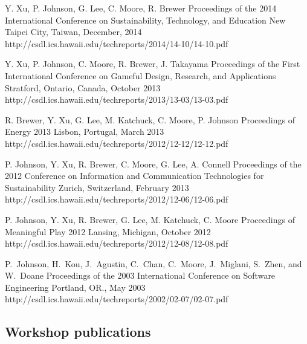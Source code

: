 \documentclass[11pt,letterpaper,sans]{moderncv} %
\begin{document}
    {Y. Xu, P. Johnson, G. Lee, C. Moore, R. Brewer}
    {Proceedings of the 2014 International Conference on Sustainability, Technology, and Education}
    {New Taipei City, Taiwan, December, 2014}
    {http://csdl.ics.hawaii.edu/techreports/2014/14-10/14-10.pdf}

    {Y. Xu, P. Johnson, C. Moore, R. Brewer, J. Takayama}
    {Proceedings of the First International Conference on Gameful Design, Research, and Applications}
    {Stratford, Ontario, Canada, October 2013}
    {http://csdl.ics.hawaii.edu/techreports/2013/13-03/13-03.pdf}

    {R. Brewer, Y. Xu, G. Lee, M. Katchuck, C. Moore, P. Johnson}
    {Proceedings of Energy 2013}
    {Lisbon, Portugal, March 2013}
    {http://csdl.ics.hawaii.edu/techreports/2012/12-12/12-12.pdf}

    {P. Johnson, Y. Xu, R. Brewer,  C. Moore,  G. Lee, A. Connell}
    {Proceedings of the 2012 Conference on Information and Communication Technologies for Sustainability}
    {Zurich, Switzerland, February 2013}
    {http://csdl.ics.hawaii.edu/techreports/2012/12-06/12-06.pdf}

    {P. Johnson, Y. Xu, R. Brewer, G. Lee, M. Katchuck, C. Moore}
    {Proceedings of Meaningful Play 2012}
    {Lansing, Michigan, October 2012}
    {http://csdl.ics.hawaii.edu/techreports/2012/12-08/12-08.pdf}

    {P.~Johnson, H.~Kou, J.~Agustin, C.~Chan, C.~Moore, J.~Miglani, S.~Zhen, and W.~Doane}
    {Proceedings of the 2003 International Conference on Software Engineering}
    {Portland, OR., May 2003}
    {http://csdl.ics.hawaii.edu/techreports/2002/02-07/02-07.pdf}

    \subsection{Workshop publications}
\end{document}
